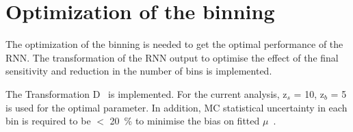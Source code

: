 \section{Optimization of the binning}
The optimization of the binning is needed to get the optimal performance of the RNN. The transformation of the RNN output to optimise the effect of the final sensitivity and reduction in the number of bins is implemented.

The Transformation D~\cite{ATL-PHYS-PUB-2019-009} is implemented.
For the current analysis, z$_s$ = 10, z$_b$ = 5 is used for the optimal parameter. In addition, MC statistical uncertainty in each bin is required to be $<$ 20~\% to minimise the bias on fitted $\mu$~\cite{ATL-PHYS-PUB-2019-009}.